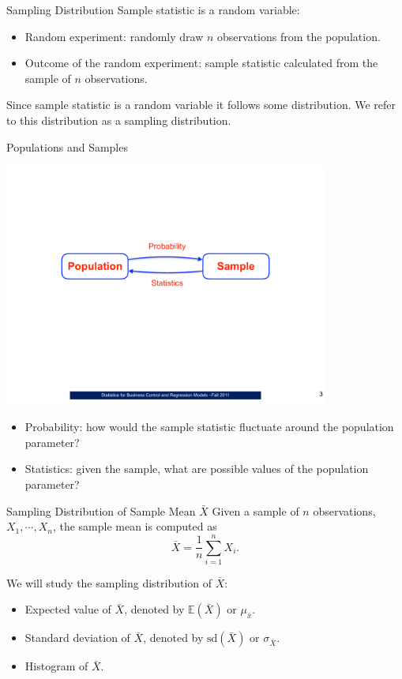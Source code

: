 \documentclass{beamer}
\newcommand{\E}{\mathbb{E}}
\newcommand{\sd}{\text{sd}}
\begin{document}
\begin{frame}{Sampling Distribution}
Sample statistic is a random variable:
\begin{itemize}
\item Random experiment: randomly draw $n$ observations from the population.
\item Outcome of the random experiment: sample statistic calculated from the sample of $n$ observations.
\end{itemize}

Since sample statistic is a random variable it follows some distribution.  
We refer to this distribution as a \alert{sampling distribution}.
\end{frame}

\begin{frame}{Populations and Samples}
\begin{center}
\includegraphics[width=0.8\textwidth]{figures/prob_and_stat.pdf}
\end{center}
\begin{itemize}
\item Probability: how would the sample statistic fluctuate around the population parameter?
\item Statistics: given the sample, what are possible values of the population parameter?
\end{itemize}
\end{frame}


\begin{frame}{Sampling Distribution of Sample Mean $\bar X$}
    Given a sample of $n$ observations, $X_1,\cdots, X_n$, the sample mean is computed as
    $$\bar X = \frac{1}{n} \sum_{i=1}^n X_i.$$

We will study the sampling distribution of $\bar X$:
\begin{itemize}
    \item Expected value of $\bar X$, denoted by $\E (\bar X)$ or $\mu_{\bar x}$.
    \item Standard deviation of $\bar X$, denoted by $\sd (\bar X)$ or $\sigma_{\bar X}$.
    \item Histogram of $\bar X$.
\end{itemize}
\end{frame}
\end{document}
